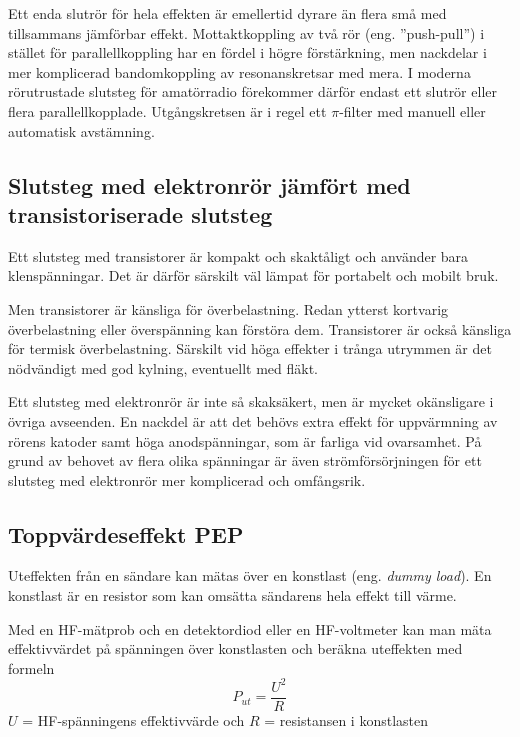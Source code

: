 Ett enda slutrör för hela effekten är emellertid dyrare än flera små med
tillsammans jämförbar effekt.
Mottaktkoppling av två rör (eng. ''push-pull'') i stället för parallellkoppling
har en fördel i högre förstärkning, men nackdelar i mer komplicerad
bandomkoppling av resonanskretsar med mera.
I moderna rörutrustade slutsteg för amatörradio förekommer därför endast ett
slutrör eller flera parallellkopplade.
Utgångskretsen är i regel ett \(\pi \)-filter med manuell eller automatisk
avstämning.

\subsection{Slutsteg med elektronrör jämfört med transistoriserade slutsteg}

Ett slutsteg med transistorer är kompakt och skaktåligt och använder
bara klenspänningar.
Det är därför särskilt väl lämpat för portabelt och mobilt bruk.

Men transistorer är känsliga för överbelastning.
Redan ytterst kortvarig överbelastning eller överspänning kan förstöra dem.
Transistorer är också känsliga för termisk överbelastning.
Särskilt vid höga effekter i trånga utrymmen är det nödvändigt med god kylning,
eventuellt med fläkt.

Ett slutsteg med elektronrör är inte så skaksäkert, men är mycket okänsligare
i övriga avseenden.
En nackdel är att det behövs extra effekt för uppvärmning av rörens katoder
samt höga anodspänningar, som är farliga vid ovarsamhet.
På grund av behovet av flera olika spänningar är även strömförsörjningen för
ett slutsteg med elektronrör mer komplicerad och omfångsrik.

\subsection{Toppvärdeseffekt PEP}
\label{PEP-effekt}

Uteffekten från en sändare kan mätas över en konstlast (eng. \emph{dummy load}).
En konstlast är en resistor som kan omsätta sändarens hela effekt till värme.

Med en HF-mätprob och en detektordiod eller en HF-voltmeter kan man mäta
effektivvärdet på spänningen över konstlasten och beräkna uteffekten med
formeln
%
\[P_{ut} = \dfrac{U^2}{R}\]
%
\(U\) = HF-spänningens effektivvärde och 
\(R\) = resistansen i konstlasten

